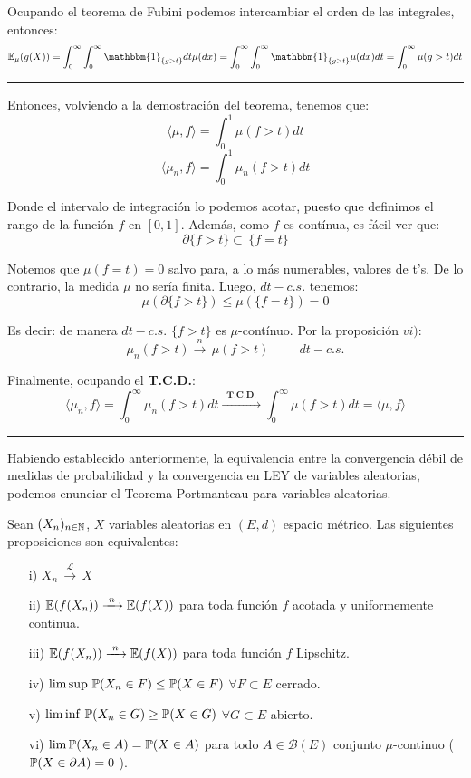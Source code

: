 Ocupando el teorema de Fubini podemos intercambiar el orden de las integrales, entonces:
\[\E_{\mu}(g(X)) = \int_{0}^{\infty}\int_{0}^{\infty}\mathbbm{1}_{\{g>t\}}dt\mu(dx) = \int_{0}^{\infty}\int_{0}^{\infty}\mathbbm{1}_{\{g>t\}}\mu(dx)dt = \int_{0}^{\infty}\mu(g>t)dt\]
\rule{0.7em}{0.7em}

Entonces, volviendo a la demostración del teorema, tenemos que:
\[\langle \mu,f\rangle = \int_{0}^{1}\mu(f>t)dt\]
\[\langle \mu_n , f \rangle = \int_{0}^{1}\mu_n(f>t)dt\]

Donde el intervalo de integración lo podemos acotar, puesto que definimos el rango de la función $f$ en $[0,1]$. Además, como $f$ es contínua, es fácil ver que:
\[\partial \{f>t\} \subset\,\{f=t\}\]

Notemos que $\mu(f=t)=0$ salvo para, a lo más numerables, valores de t's. De lo contrario, la medida $\mu$ no sería finita. Luego, $dt-c.s.$ tenemos:
\[\mu(\partial\{f>t\}) \leq \mu(\{f=t\}) = 0\]

Es decir: de manera $dt-c.s.$ $\{f>t\}$ es $\mu$-contínuo. Por la proposición $vi)$:
\[\mu_n(f>t) \xrightarrow{\,\,n\,\,}\,\mu(f>t)\hspace{1cm}dt-c.s.\]

Finalmente, ocupando el \textbf{T.C.D.}:
\[\langle\mu_n,f\rangle = \int_{0}^{\infty}\mu_n(f>t)dt \xrightarrow{\,\,\,\textbf{T.C.D.}\,\,\,}\int_{0}^{\infty}\mu(f>t)dt = \langle \mu,f\rangle\]
\rule{0.7em}{0.7em}

Habiendo establecido anteriormente, la equivalencia entre la convergencia débil de medidas de probabilidad y la convergencia en LEY de variables aleatorias, podemos enunciar el Teorema Portmanteau para variables aleatorias.

\begin{teorema} Sean $(X_n)_{n\in\mathbb N}$, $X$ variables aleatorias en $(E,d)$ espacio métrico. Las siguientes proposiciones son equivalentes:
\begin{enumerate}
    \item[i)] $X_n\,\xrightarrow{\mathcal{L}}\,X$
    \item[ii)] $\mathbb E(f(X_n)) \xrightarrow{\,\,n\,\,}\mathbb E(f(X))$ para toda función $f$ acotada y uniformemente continua.
    \item[iii)] $\mathbb E(f(X_n)) \xrightarrow{\,\,n\,\,}\mathbb E(f(X))$ para toda función $f$ Lipschitz.
    \item[iv)] $\limsup\,\mathbb{P}(X_n \in F) \leq \mathbb{P}(X\in F)$ $\forall F\subset E$ cerrado.
    \item[v)] $\liminf\,\mathbb{P}(X_n \in G) \geq \mathbb{P}(X \in G)$ $\forall G\subset E$ abierto.
    \item[vi)] $\lim \mathbb{P}(X_n \in A) = \mathbb{P}(X\in A)$ para todo $A\in \mathcal{B}(E)$ conjunto $\mu$-continuo ( $\mathbb{P}(X \in \partial A) = 0$ ).
\end{enumerate}
\end{teorema}

